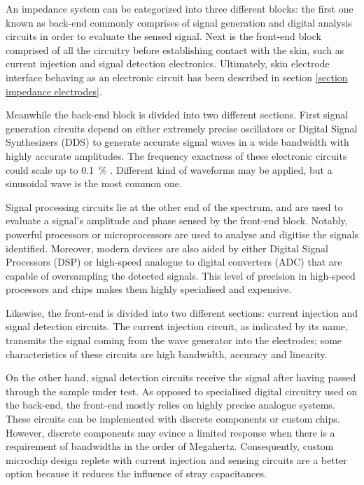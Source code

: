 An impedance system can be categorized into three different blocks: the first one known as back-end commonly comprises of signal generation and digital analysis circuits in order to evaluate the sensed signal. Next is the front-end block comprised of all the circuitry before establishing contact with the skin, such as current injection and signal detection electronics. Ultimately, skin electrode interface behaving as an electronic circuit has been described in section \ref{section impedance electrodes}. 

Meanwhile the back-end block is divided into two different sections. First signal generation circuits depend on either extremely precise oscillators or Digital Signal Synthesizers (DDS) to generate accurate signal waves in a wide bandwidth with highly accurate amplitudes. The frequency exactness of these electronic circuits could scale up to \SI{0.1}{\percent} \cite{ad:AD5930}.  Different kind of waveforms may be applied, but a sinusoidal wave is the most common one. 

Signal processing circuits lie at the other end of the spectrum, and are used to evaluate a signal's amplitude and phase sensed by the front-end block.  Notably, powerful processors or microprocessors are used to analyse and digitise the signals identified. Moreover, modern devices are also aided by either Digital Signal Processors (DSP) or high-speed analogue to digital converters (ADC) that are capable of oversampling the detected signals. This level of precision in high-speed processors and chips makes them highly specialised and expensive.

Likewise, the front-end is divided into two different sections: current injection and signal detection circuits. The current injection circuit, as indicated by its name, transmits the signal coming from the wave generator into the electrodes; some characteristics of these circuits are high bandwidth, accuracy and linearity. 

On the other hand, signal detection circuits receive the signal after having passed through the sample under test. As opposed to specialised digital circuitry used on the back-end, the front-end mostly relies on highly precise analogue systems. These circuits can be implemented with discrete components or custom chips. However, discrete components may evince a limited response when there is a requirement of bandwidths in the order of Megahertz. Consequently, custom microchip design replete with current injection and sensing circuits are a better option because it reduces the influence of stray capacitances. 

